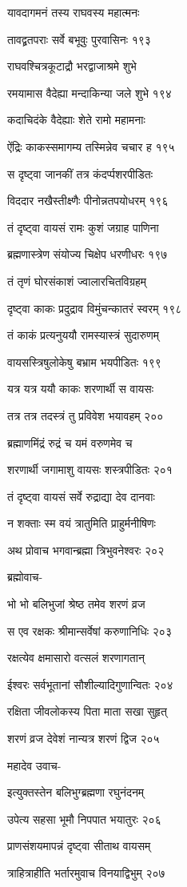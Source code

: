 यावदागमनं तस्य राघवस्य महात्मनः

तावद्व्रतपराः सर्वे बभूवुः पुरवासिनः १९३

राघवश्चित्रकूटाद्रौ भरद्वाजाश्रमे शुभे

रमयामास वैदेह्या मन्दाकिन्या जले शुभे १९४

कदाचिदंके वैदेह्याः शेते रामो महामनाः

ऐंद्रिः काकस्समागम्य तस्मिन्नेव चचार ह १९५

स दृष्ट्वा जानकीं तत्र कंदर्प्पशरपीडितः

विददार नखैस्तीक्ष्णैः पीनोन्नतपयोधरम् १९६

तं दृष्ट्वा वायसं रामः कुशं जग्राह पाणिना

ब्रह्मणास्त्रेण संयोज्य चिक्षेप धरणीधरः १९७

तं तृणं घोरसंकाशं ज्वालारचितविग्रहम्

दृष्ट्वा काकः प्रदुद्राव विमुंचन्कातरं स्वरम् १९८

तं काकं प्रत्यनुययौ रामस्यास्त्रं सुदारुणम्

वायसस्त्रिषुलोकेषु बभ्राम भयपीडितः १९९

यत्र यत्र ययौ काकः शरणार्थी स वायसः

तत्र तत्र तदस्त्रं तु प्रविवेश भयावहम् २००

ब्रह्माणमिंद्रं रुद्रं च यमं वरुणमेव च

शरणार्थी जगामाशु वायसः शस्त्रपीडितः २०१

तं दृष्ट्वा वायसं सर्वे रुद्राद्या देव दानवाः

न शक्ताः स्म वयं त्रातुमिति प्राहुर्मनीषिणः

अथ प्रोवाच भगवान्ब्रह्मा त्रिभुवनेश्वरः २०२

ब्रह्मोवाच-

भो भो बलिभुजां श्रेष्ठ तमेव शरणं व्रज

स एव रक्षकः श्रीमान्सर्वेषां करुणानिधिः २०३

रक्षत्येव क्षमासारो वत्सलं शरणागतान्

ईश्वरः सर्वभूतानां सौशील्यादिगुणान्वितः २०४

रक्षिता जीवलोकस्य पिता माता सखा सुहृत्

शरणं व्रज देवेशं नान्यत्र शरणं द्विज २०५

महादेव उवाच-

इत्युक्तस्तेन बलिभुग्ब्रह्मणा रघुनंदनम्

उपेत्य सहसा भूमौ निपपात भयातुरः २०६

प्राणसंशयमापन्नं दृष्ट्वा सीताथ वायसम्

त्राहित्राहीति भर्तारमुवाच विनयाद्विभुम् २०७

